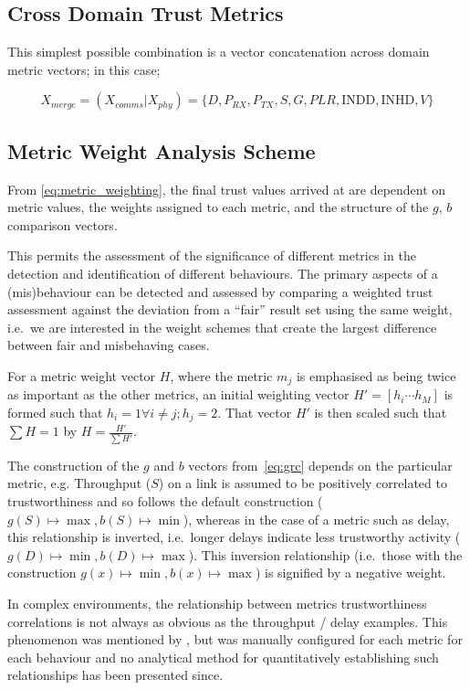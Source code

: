 \subsection{Cross Domain Trust Metrics}
This simplest possible combination is a vector concatenation across domain metric vectors; in this case; 

\begin{equation}
  X_{merge} =  (X_{comms}|X_{phy}) = \{D, P_{RX}, P_{TX}, S, G, PLR, \text{INDD}, \text{INHD}, V\}
  \label{eq:phys:vector}
\end{equation}


\subsection{Metric Weight Analysis Scheme}

From \eqref{eq:metric_weighting}, the final trust values arrived at are dependent on metric values, the weights assigned to each metric, and the structure of the $g$, $b$ comparison vectors.

This permits the assessment of the significance of different metrics in the detection and identification of different behaviours. 
The primary aspects of a (mis)behaviour can be detected and assessed by comparing a weighted trust assessment against the deviation from a ``fair'' result set using the same weight, i.e.\ we are interested in the weight schemes that create the largest difference between fair and misbehaving cases.

For a metric weight vector $H$, where the metric $m_j$ is emphasised as being twice as important as the other metrics, an initial weighting vector $H'=[h_i\cdots h_M]$ is formed such that $h_i = 1 \forall i \ne j; h_j=2$. That vector $H'$ is then scaled such that $\sum H = 1$ by $H= \frac{H'}{\sum H'}$.

The construction of the $g$ and $b$ vectors from~\eqref{eq:grc} depends on the particular metric, e.g. Throughput ($S$) on a link is assumed to be positively correlated to trustworthiness and so follows the default construction ($g(S) \mapsto \max, b(S) \mapsto \min$), whereas in the case of a metric such as delay, this relationship is inverted, i.e.\ longer delays indicate less trustworthy activity ($g(D) \mapsto \min, b(D) \mapsto \max$).
This inversion relationship (i.e.\ those with the construction $g(x) \mapsto \min, b(x) \mapsto \max$) is signified by a negative weight.

In complex environments, the relationship between metrics trustworthiness correlations is not always as obvious as the throughput / delay examples.
This phenomenon was mentioned by \citet{Guo2012}, but was manually configured for each metric for each behaviour and no analytical method for quantitatively establishing such relationships has been presented since.

